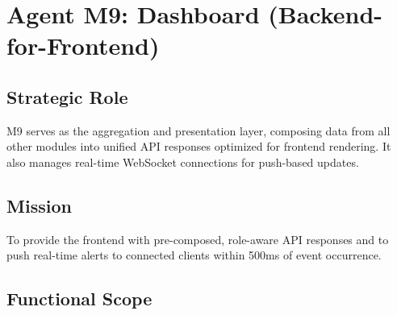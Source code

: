\documentclass[12pt,a4paper,twoside]{report}
\begin{document}
\section{Agent M9: Dashboard (Backend-for-Frontend)}

\subsection{Strategic Role}
M9 serves as the aggregation and presentation layer, composing data from all other modules into unified API responses optimized for frontend rendering. It also manages real-time WebSocket connections for push-based updates.

\subsection{Mission}
To provide the frontend with pre-composed, role-aware API responses and to push real-time alerts to connected clients within 500ms of event occurrence.

\subsection{Functional Scope}
\end{document}
